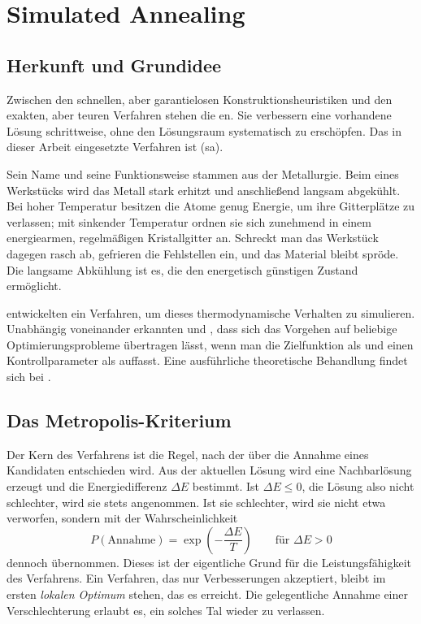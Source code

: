 \section{Simulated Annealing}
\label{sec:sa}

\subsection{Herkunft und Grundidee}

Zwischen den schnellen, aber garantielosen Konstruktionsheuristiken und den
exakten, aber teuren Verfahren stehen die en. Sie
verbessern eine vorhandene Lösung schrittweise, ohne den Lösungsraum
systematisch zu erschöpfen. Das in dieser Arbeit eingesetzte Verfahren ist
 (\ac{sa}).

Sein Name und seine Funktionsweise stammen aus der Metallurgie. Beim
 eines Werkstücks wird das Metall stark erhitzt und
anschließend langsam abgekühlt. Bei hoher Temperatur besitzen die Atome genug
Energie, um ihre Gitterplätze zu verlassen; mit sinkender Temperatur ordnen sie
sich zunehmend in einem energiearmen, regelmäßigen Kristallgitter an. Schreckt
man das Werkstück dagegen rasch ab, gefrieren die Fehlstellen ein, und das
Material bleibt spröde. Die langsame Abkühlung ist es, die den energetisch
günstigen Zustand ermöglicht.

\textcite{metropolis1953equation} entwickelten ein Verfahren, um dieses
thermodynamische Verhalten zu simulieren. Unabhängig voneinander erkannten
\textcite{kirkpatrick1983optimization} und \textcite{cerny1985thermodynamical},
dass sich das Vorgehen auf beliebige Optimierungsprobleme übertragen lässt, wenn
man die Zielfunktion als  und einen Kontrollparameter als
 auffasst. Eine ausführliche theoretische Behandlung findet
sich bei \textcite{laarhoven1987simulated}.

\subsection{Das Metropolis-Kriterium}

Der Kern des Verfahrens ist die Regel, nach der über die Annahme eines
Kandidaten entschieden wird. Aus der aktuellen Lösung wird eine Nachbarlösung
erzeugt und die Energiedifferenz $\Delta E$ bestimmt. Ist $\Delta E \le 0$, die
Lösung also nicht schlechter, wird sie stets angenommen. Ist sie schlechter,
wird sie nicht etwa verworfen, sondern mit der Wahrscheinlichkeit
\begin{equation}
  P(\text{Annahme}) = \exp\!\left(-\frac{\Delta E}{T}\right)
  \qquad \text{für } \Delta E > 0
  \label{eq:metropolis}
\end{equation}
dennoch übernommen. Dieses  ist der eigentliche
Grund für die Leistungsfähigkeit des Verfahrens. Ein Verfahren, das nur
Verbesserungen akzeptiert, bleibt im ersten \emph{lokalen
Optimum} stehen, das es erreicht. Die gelegentliche Annahme einer
Verschlechterung erlaubt es, ein solches Tal wieder zu verlassen.

